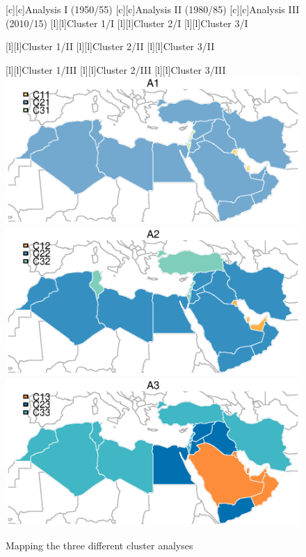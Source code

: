 \documentclass[11pt,a4paper]{article}
\begin{document}
\pagestyle{empty}

\begin{figure}
[c][c]{\large{Analysis I (1950/55)}}
[c][c]{\large{Analysis II (1980/85)}}
[c][c]{\large{Analysis III (2010/15)}}
[l][l]{\small{Cluster 1/I}}
[l][l]{\small{Cluster 2/I}}
[l][l]{\small{Cluster 3/I}}

[l][l]{\small{Cluster 1/II}}
[l][l]{\small{Cluster 2/II}}
[l][l]{\small{Cluster 3/II}}

[l][l]{\small{Cluster 1/III}}
[l][l]{\small{Cluster 2/III}}
[l][l]{\small{Cluster 3/III}}
\includegraphics[]{map1.eps}
\includegraphics[]{map2.eps}
\includegraphics[]{map3.eps}

\caption{Mapping the three different cluster analyses}
\end{figure}
\end{document}
